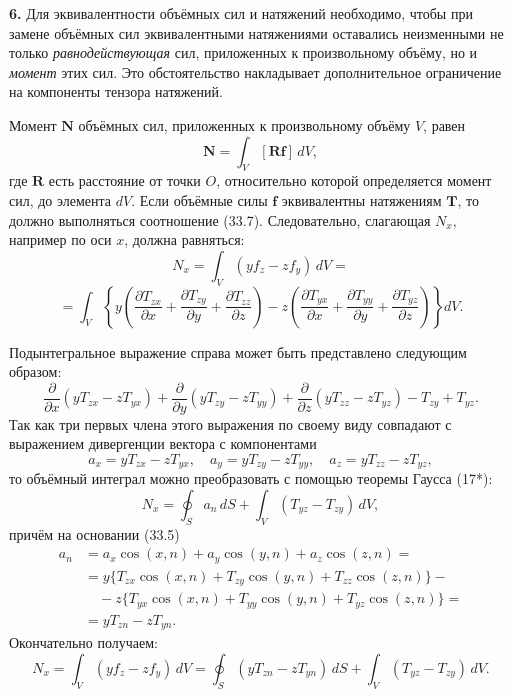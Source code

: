 \documentclass[a4paper,12pt]{article}
\begin{document}
\textbf{6.} Для эквивалентности объёмных сил и натяжений необходимо,
чтобы при замене объёмных сил эквивалентными натяжениями оставались
неизменными не только \textit{равнодействующая} сил, приложенных к
произвольному объёму, но и \textit{момент} этих сил. Это обстоятельство
накладывает дополнительное ограничение на компоненты тензора натяжений.

Момент $\mathbf{N}$ объёмных сил, приложенных к произвольному объёму
$V$, равен
\begin{equation}
    \mathbf{N} = \int_V [\mathbf{R}\mathbf{f}]\,dV,
    \tag{33.8}
\end{equation}
где $\mathbf{R}$ есть расстояние от точки $O$, относительно которой
определяется момент сил, до элемента $dV$. Если объёмные силы
$\mathbf{f}$ эквивалентны натяжениям $\mathbf{T}$, то должно
выполняться соотношение (33.7). Следовательно, слагающая $N_x$,
например по оси $x$, должна равняться:
$$
    N_x = \int_V (yf_z - zf_y)\,dV =
$$
$$
    = \int_V\!\left\{
        y\!\left(
            \frac{\partial T_{zx}}{\partial x}
          + \frac{\partial T_{zy}}{\partial y}
          + \frac{\partial T_{zz}}{\partial z}
        \right)
        - z\!\left(
            \frac{\partial T_{yx}}{\partial x}
          + \frac{\partial T_{yy}}{\partial y}
          + \frac{\partial T_{yz}}{\partial z}
        \right)
    \right\}dV.
$$


Подынтегральное выражение справа может быть представлено следующим
образом:
$$
    \frac{\partial}{\partial x}(yT_{zx} - zT_{yx})
  + \frac{\partial}{\partial y}(yT_{zy} - zT_{yy})
  + \frac{\partial}{\partial z}(yT_{zz} - zT_{yz})
  - T_{zy} + T_{yz}.
$$
Так как три первых члена этого выражения по своему виду совпадают
с выражением дивергенции вектора с компонентами
$$
    a_x = yT_{zx} - zT_{yx},\quad
    a_y = yT_{zy} - zT_{yy},\quad
    a_z = yT_{zz} - zT_{yz},
$$
то объёмный интеграл можно преобразовать с помощью теоремы Гаусса (17*):
$$
    N_x = \oint_S a_n\,dS + \int_V (T_{yz} - T_{zy})\,dV,
$$
причём на основании (33.5)
\begin{align*}
    a_n &= a_x\cos(x,n) + a_y\cos(y,n) + a_z\cos(z,n) = \\
        &= y\{T_{zx}\cos(x,n) + T_{zy}\cos(y,n) + T_{zz}\cos(z,n)\} - \\
        &\quad - z\{T_{yx}\cos(x,n) + T_{yy}\cos(y,n) + T_{yz}\cos(z,n)\} = \\
        &= yT_{zn} - zT_{yn}.
\end{align*}
Окончательно получаем:
\begin{equation}
    N_x = \int_V (yf_z - zf_y)\,dV
        = \oint_S (yT_{zn} - zT_{yn})\,dS
        + \int_V (T_{yz} - T_{zy})\,dV.
    \tag{33.9}
\end{equation}
\end{document}
